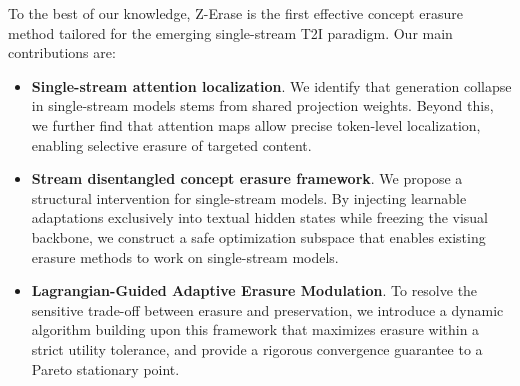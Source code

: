 To the best of our knowledge, Z-Erase is the first effective concept erasure method tailored for the emerging single-stream T2I paradigm. Our main contributions are:
\begin{itemize}[leftmargin=*]
\item \textbf{Single-stream attention localization}. We identify that generation collapse in single-stream models stems from shared projection weights. Beyond this, we further find that attention maps allow precise token-level localization, enabling selective erasure of targeted content.
\item \textbf{Stream disentangled concept erasure framework}. We propose a structural intervention for single-stream models. By injecting learnable adaptations exclusively into textual hidden states while freezing the visual backbone, we construct a safe optimization subspace that enables existing erasure methods to work on single-stream models.
\item \textbf{Lagrangian-Guided Adaptive Erasure Modulation}. To resolve the sensitive trade-off between erasure and preservation, we introduce a dynamic algorithm building upon this framework that maximizes erasure within a strict utility tolerance, and provide a rigorous convergence guarantee to a Pareto stationary point.
\end{itemize}